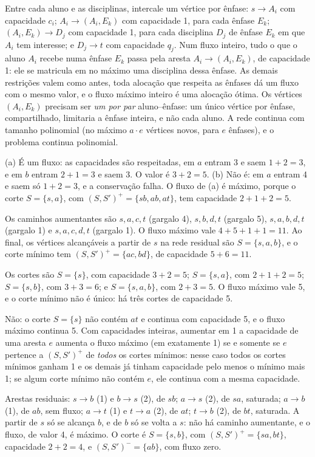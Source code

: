  Entre cada aluno e as disciplinas, intercale um vértice por ênfase: $s\to A_i$ com capacidade $c_i$; $A_i\to(A_i,E_k)$ com capacidade 1, para cada ênfase $E_k$; $(A_i,E_k)\to D_j$ com capacidade 1, para cada disciplina $D_j$ de ênfase $E_k$ em que $A_i$ tem interesse; e $D_j\to t$ com capacidade $q_j$. Num fluxo inteiro, tudo o que o aluno $A_i$ recebe numa ênfase $E_k$ passa pela aresta $A_i\to(A_i,E_k)$, de capacidade 1: ele se matricula em no máximo uma disciplina dessa ênfase. As demais restrições valem como antes, toda alocação que respeita as ênfases dá um fluxo com o mesmo valor, e o fluxo máximo inteiro é uma alocação ótima. Os vértices $(A_i,E_k)$ precisam ser \emph{um por par} aluno--ênfase: um único vértice por ênfase, compartilhado, limitaria a ênfase inteira, e não cada aluno. A rede continua com tamanho polinomial (no máximo $a\cdot e$ vértices novos, para $e$ ênfases), e o problema continua polinomial.

 (a) É um fluxo: as capacidades são respeitadas, em $a$ entram 3 e saem $1+2=3$, e em $b$ entram $2+1=3$ e saem 3. O valor é $3+2=5$. (b) Não é: em $a$ entram 4 e saem só $1+2=3$, e a conservação falha. O fluxo de (a) é máximo, porque o corte $S=\{s,a\}$, com $(S,S')^+=\{sb,ab,at\}$, tem capacidade $2+1+2=5$.

 Os caminhos aumentantes são $s,a,c,t$ (gargalo 4), $s,b,d,t$ (gargalo 5), $s,a,b,d,t$ (gargalo 1) e $s,a,c,d,t$ (gargalo 1). O fluxo máximo vale $4+5+1+1=11$. Ao final, os vértices alcançáveis a partir de $s$ na rede residual são $S=\{s,a,b\}$, e o corte mínimo tem $(S,S')^+=\{ac,bd\}$, de capacidade $5+6=11$.

 Os cortes são $S=\{s\}$, com capacidade $3+2=5$; $S=\{s,a\}$, com $2+1+2=5$; $S=\{s,b\}$, com $3+3=6$; e $S=\{s,a,b\}$, com $2+3=5$. O fluxo máximo vale 5, e o corte mínimo não é único: há três cortes de capacidade 5.

 Não: o corte $S=\{s\}$ não contém $at$ e continua com capacidade 5, e o fluxo máximo continua 5. Com capacidades inteiras, aumentar em 1 a capacidade de uma aresta $e$ aumenta o fluxo máximo (em exatamente 1) se e somente se $e$ pertence a $(S,S')^+$ de \emph{todos} os cortes mínimos: nesse caso todos os cortes mínimos ganham 1 e os demais já tinham capacidade pelo menos o mínimo mais 1; se algum corte mínimo não contém $e$, ele continua com a mesma capacidade.

 Arestas residuais: $s\to b$ (1) e $b\to s$ (2), de $sb$; $a\to s$ (2), de $sa$, saturada; $a\to b$ (1), de $ab$, sem fluxo; $a\to t$ (1) e $t\to a$ (2), de $at$; $t\to b$ (2), de $bt$, saturada. A partir de $s$ só se alcança $b$, e de $b$ só se volta a $s$: não há caminho aumentante, e o fluxo, de valor 4, é máximo. O corte é $S=\{s,b\}$, com $(S,S')^+=\{sa,bt\}$, capacidade $2+2=4$, e $(S,S')^-=\{ab\}$, com fluxo zero.

